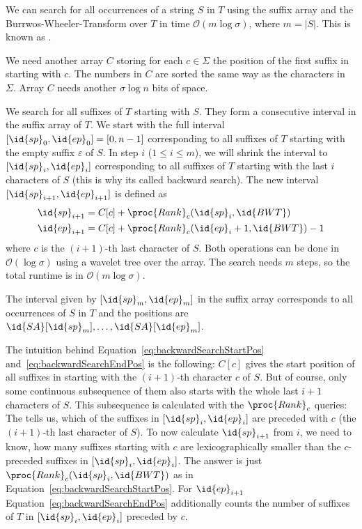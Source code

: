 \begin{Theorem}
  We can search for all occurrences of a string $S$ in $T$ using the suffix array  and the Burrwos-Wheeler-Transform  over $T$ in time $\mathcal{O}(m\log \sigma)$, where $m = \vert S \vert$. This is known as .
\end{Theorem}

\begin{Proof}
  We need another array $C$ storing for each $c \in \Sigma$ the position of the first suffix in~ starting with $c$. The numbers in $C$ are sorted the same way as the characters in~$\Sigma$. Array $C$ needs another $\sigma\log n$ bits of space.

  We search for all suffixes of $T$ starting with $S$. They form a consecutive interval in the suffix array  of $T$. We start with the full interval $[\id{sp}_0,\id{ep}_0]=[0,n-1]$ corresponding to all suffixes of $T$ starting with the empty suffix $\varepsilon$ of $S$. In step $i$ ($1 \leq i \leq m$), we will shrink the interval to $[\id{sp}_i,\id{ep}_i]$ corresponding to all suffixes of $T$ starting with the last $i$ characters of $S$ (this is why its called backward search). The new interval $[\id{sp}_{i+1},\id{ep}_{i+1}]$ is defined as
  \begin{align}
    \id{sp}_{i+1} &= C[c] + \proc{Rank}_c(\id{sp}_i, \id{BWT})
    \label{eq:backwardSearchStartPos} \\
    \id{ep}_{i+1} &= C[c] + \proc{Rank}_c(\id{ep}_i + 1, \id{BWT}) - 1
    \label{eq:backwardSearchEndPos}
  \end{align}
  where $c$ is the $(i+1)$-th last character of $S$. Both operations can be done in $\mathcal{O}(\log\sigma)$ using a wavelet tree over the  array. The search needs $m$ steps, so the total runtime is in $\mathcal{O}(m\log\sigma)$.

  The interval given by $[\id{sp}_m,\id{ep}_m]$ in the suffix array corresponds to all occurrences of $S$ in $T$ and the positions are $\id{SA}[\id{sp}_m], \ldots, \id{SA}[\id{ep}_m]$.
\end{Proof}

The intuition behind Equation~\ref{eq:backwardSearchStartPos} and~\ref{eq:backwardSearchEndPos} is the following: $C[c]$ gives the start position of all suffixes in  starting with the $(i+1)$-th character $c$ of $S$. But of course, only some continuous subsequence of them also starts with the whole last $i+1$ characters of $S$. This subsequence is calculated with the $\proc{Rank}_c$ queries: The  tells us, which of the suffixes in $[\id{sp}_i,\id{ep}_i]$ are preceded with $c$ (the $(i+1)$-th last character of $S$). To now calculate $\id{sp}_{i+1}$ from $i$, we need to know, how many suffixes starting with $c$ are lexicographically smaller than the $c$-preceded suffixes in $[\id{sp}_i,\id{ep}_i]$. The answer is just $\proc{Rank}_c(\id{sp}_i, \id{BWT})$ as in Equation~\ref{eq:backwardSearchStartPos}. For $\id{ep}_{i+1}$ Equation~\ref{eq:backwardSearchEndPos} additionally counts the number of suffixes of $T$ in $[\id{sp}_i,\id{ep}_i]$ preceded by $c$.

